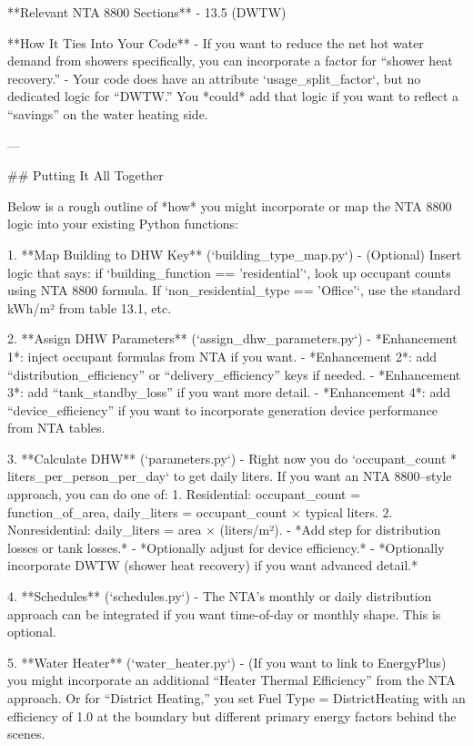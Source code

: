 **Relevant NTA 8800 Sections**  
- 13.5 (DWTW)  

**How It Ties Into Your Code**  
- If you want to reduce the net hot water demand from showers specifically, you can incorporate a factor for “shower heat recovery.”  
- Your code does have an attribute `usage_split_factor`, but no dedicated logic for “DWTW.” You *could* add that logic if you want to reflect a “savings” on the water heating side.  

---

## Putting It All Together

Below is a rough outline of *how* you might incorporate or map the NTA 8800 logic into your existing Python functions:

1. **Map Building to DHW Key** (`building_type_map.py`)  
   - (Optional) Insert logic that says: if `building_function == 'residential'`, look up occupant counts using NTA 8800 formula. If `non_residential_type == 'Office'`, use the standard kWh/m² from table 13.1, etc.

2. **Assign DHW Parameters** (`assign_dhw_parameters.py`)  
   - *Enhancement 1*: inject occupant formulas from NTA if you want.  
   - *Enhancement 2*: add “distribution_efficiency” or “delivery_efficiency” keys if needed.  
   - *Enhancement 3*: add “tank_standby_loss” if you want more detail.  
   - *Enhancement 4*: add “device_efficiency” if you want to incorporate generation device performance from NTA tables.

3. **Calculate DHW** (`parameters.py`)  
   - Right now you do `occupant_count * liters_per_person_per_day` to get daily liters. If you want an NTA 8800–style approach, you can do one of:  
     1. Residential: occupant_count = function_of_area, daily_liters = occupant_count × typical liters.  
     2. Nonresidential: daily_liters = area × (liters/m²).  
   - *Add step for distribution losses or tank losses.*  
   - *Optionally adjust for device efficiency.*  
   - *Optionally incorporate DWTW (shower heat recovery) if you want advanced detail.*  

4. **Schedules** (`schedules.py`)  
   - The NTA’s monthly or daily distribution approach can be integrated if you want time-of-day or monthly shape. This is optional.

5. **Water Heater** (`water_heater.py`)  
   - (If you want to link to EnergyPlus) you might incorporate an additional “Heater Thermal Efficiency” from the NTA approach. Or for “District Heating,” you set Fuel Type = DistrictHeating with an efficiency of 1.0 at the boundary but different primary energy factors behind the scenes.  

